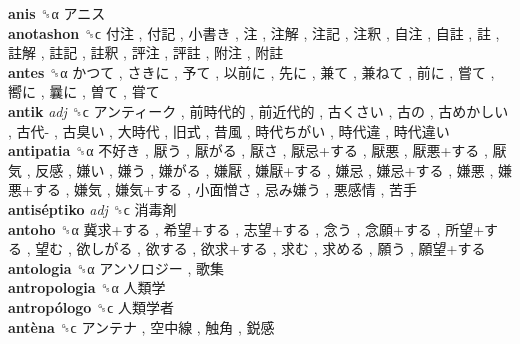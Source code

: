 \textbf{anis} ␝α   アニス   \\
\textbf{anotashon} ␝ϲ   付注 ,  付記 ,  小書き ,  注 ,  注解 ,  注記 ,  注釈 ,  自注 ,  自註 ,  註 ,  註解 ,  註記 ,  註釈 ,  評注 ,  評註 ,  附注 ,  附註   \\
\textbf{antes} ␝α   かつて ,  さきに ,  予て ,  以前に ,  先に ,  兼て ,  兼ねて ,  前に ,  嘗て ,  嚮に ,  曩に ,  曽て ,  甞て   \\
\textbf{antik} \emph{adj}  ␝ϲ   アンティーク ,  前時代的 ,  前近代的 ,  古くさい ,  古の ,  古めかしい ,  古代- ,  古臭い ,  大時代 ,  旧式 ,  昔風 ,  時代ちがい ,  時代違 ,  時代違い   \\
\textbf{antipatia} ␝α   不好き ,  厭う ,  厭がる ,  厭さ ,  厭忌+する ,  厭悪 ,  厭悪+する ,  厭気 ,  反感 ,  嫌い ,  嫌う ,  嫌がる ,  嫌厭 ,  嫌厭+する ,  嫌忌 ,  嫌忌+する ,  嫌悪 ,  嫌悪+する ,  嫌気 ,  嫌気+する ,  小面憎さ ,  忌み嫌う ,  悪感情 ,  苦手   \\
\textbf{antiséptiko} \emph{adj}  ␝ϲ   消毒剤   \\
\textbf{antoho} ␝α   冀求+する ,  希望+する ,  志望+する ,  念う ,  念願+する ,  所望+する ,  望む ,  欲しがる ,  欲する ,  欲求+する ,  求む ,  求める ,  願う ,  願望+する   \\
\textbf{antologia} ␝α   アンソロジー ,  歌集   \\
\textbf{antropologia} ␝α   人類学   \\
\textbf{antropólogo} ␝ϲ   人類学者   \\
\textbf{antèna} ␝ϲ   アンテナ ,  空中線 ,  触角 ,  鋭感   \\
